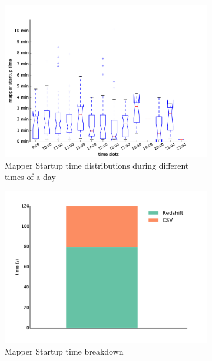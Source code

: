 

\begin{figure}[tb]
  \centering
  \begin{subfigure}{.8\textwidth}
    \centering
    \includegraphics[width=\textwidth]{mapper_startup_time_distribution.pdf}
    \caption{Mapper Startup time distributions during different times of a day}
    \label{fig:mapper}
  \end{subfigure}
  \begin{subfigure}{.8\textwidth}
    \centering
    \includegraphics[width=\textwidth]{RedshiftCSV_bar.pdf}
    \caption{Mapper Startup time breakdown}
    \label{fig:breakdown}
  \end{subfigure}
  \caption{}
\end{figure}


